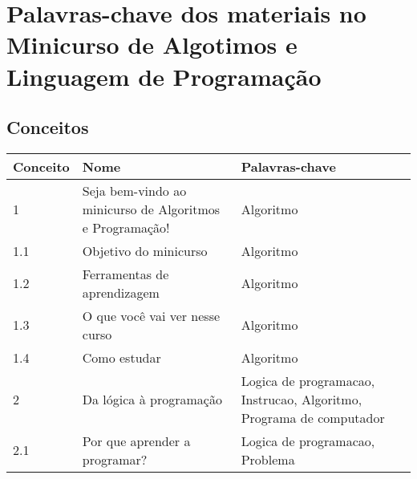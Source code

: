 \chapter{Palavras-chave dos materiais no Minicurso de Algotimos e Linguagem de Programação}\label{ape:palavras-chave-materiais}

\section{Conceitos}

\begin{longtable}{| p{} | p{} | p{} |}
\hline
Conceito & Nome                                                     & Palavras-chave                                                                                                                \\ \hline
1        & Seja bem-vindo ao minicurso de Algoritmos e Programação! & Algoritmo                                                                                                                     \\ \hline
1.1      & Objetivo do minicurso                                    & Algoritmo                                                                                                                     \\ \hline
1.2      & Ferramentas de aprendizagem                              & Algoritmo                                                                                                                     \\ \hline
1.3      & O que você vai ver nesse curso                           & Algoritmo                                                                                                                     \\ \hline
1.4      & Como estudar                                             & Algoritmo                                                                                                                     \\ \hline
2        & Da lógica à programação                                  & Logica de programacao, Instrucao, Algoritmo, Programa de computador                                                           \\ \hline
2.1      & Por que aprender a programar?                            & Logica de programacao, Problema                                                                                               \\ \hline

\end{longtable}
